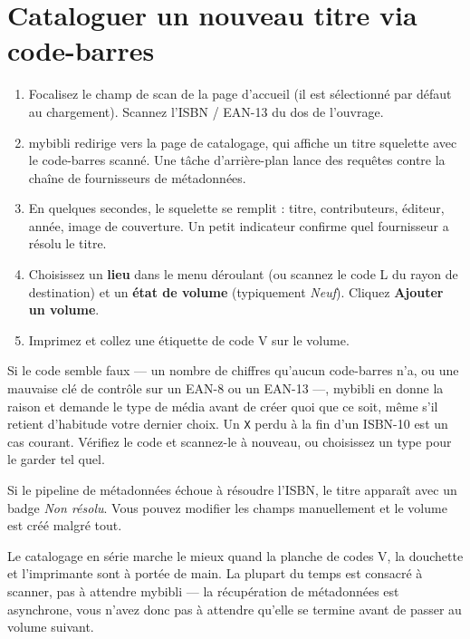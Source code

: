 \section{Cataloguer un nouveau titre via code-barres}\label{sec:catalog-scan}

\begin{enumerate}
  \item Focalisez le champ de scan de la page d'accueil (il est
        sélectionné par défaut au chargement). Scannez l'ISBN /
        EAN-13 du dos de l'ouvrage.
  \item mybibli redirige vers la page de catalogage, qui affiche un
        titre squelette avec le code-barres scanné. Une tâche
        d'arrière-plan lance des requêtes contre la chaîne de
        fournisseurs de métadonnées.
  \item En quelques secondes, le squelette se remplit : titre,
        contributeurs, éditeur, année, image de couverture. Un
        petit indicateur confirme quel fournisseur a résolu le
        titre.
  \item Choisissez un \textbf{lieu} dans le menu
        déroulant (ou scannez le code L du rayon de destination) et
        un \textbf{état de volume}
        (typiquement \emph{Neuf}). Cliquez \textbf{Ajouter un
        volume}.
  \item Imprimez et collez une étiquette de code V sur le volume.
\end{enumerate}

Si le code semble faux --- un nombre de chiffres qu'aucun code-barres
n'a, ou une mauvaise clé de contrôle sur un EAN-8 ou un EAN-13 ---,
mybibli en donne la raison et
demande le type de média avant de créer quoi que ce soit, même s'il
retient d'habitude votre dernier choix. Un \texttt{X} perdu à la fin d'un
ISBN-10 est un cas courant. Vérifiez le code et scannez-le à nouveau, ou
choisissez un type pour le garder tel quel.

Si le pipeline de métadonnées échoue à résoudre l'ISBN, le titre
apparaît avec un badge \emph{Non résolu}. Vous pouvez modifier les
champs manuellement et le volume est créé malgré tout.

\begin{tip}
Le catalogage en série marche le mieux quand la planche de codes V,
la douchette et l'imprimante sont à portée de main. La plupart du
temps est consacré à scanner, pas à attendre mybibli — la
récupération de métadonnées est asynchrone, vous n'avez donc pas à
attendre qu'elle se termine avant de passer au volume suivant.
\end{tip}

